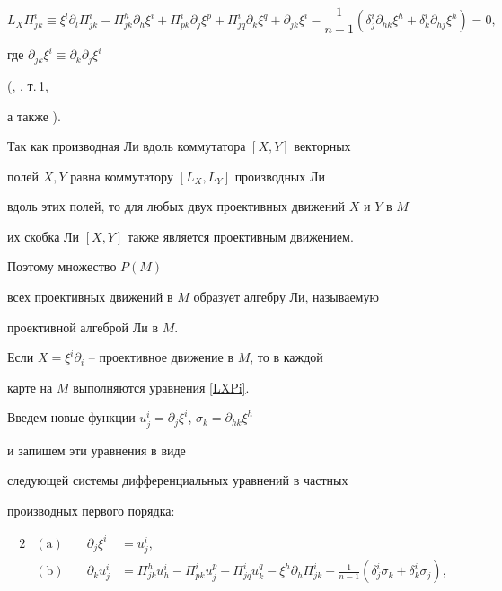 \begin{equation}\label{LXPi}


L_X\Pi ^{i}_{jk} \equiv \xi^{l}\partial_{l}\Pi^{i}_{jk}-


\Pi^{h}_{jk}\partial_{h}\xi^{i}


+\Pi^{i}_{pk}\partial_{j}\xi^{p}+


\Pi^{i}_{jq}\partial_{k}\xi^{q}+\partial_{jk}\xi^{i}-


\frac{1}{n-1}(\delta^{i}_{j}\partial_{hk}\xi^{h}


+\delta^{i}_{k}\partial_{hj}\xi^{h})=0,


\end{equation}


где $\partial_{jk}\xi^{i}\equiv \partial_{k}\partial_{j} \xi^i$


(\cite{Yano_57}, \cite{Kobayashi-Nomizu_69}, т.\,1,


а также \cite{Amin-Yanus-03}).





Так как производная Ли вдоль коммутатора $[X,Y]$ векторных


полей $X,Y$ равна коммутатору $[L_X,L_Y]$ производных Ли


вдоль этих полей, то для любых двух проективных движений $X$ и $Y$ в $M$


их скобка Ли $[X,Y]$ также является проективным движением.


Поэтому множество $P(M)$


всех проективных движений в $M$ образует алгебру Ли, называемую


проективной алгеброй Ли в $M$.





Если $X=\xi^i\partial_i$ -- проективное движение в $M$, то в каждой


карте на $M$ выполняются уравнения \eqref{LXPi}.


Введем новые функции $u_j^i=\partial_j\xi^i$, $\sigma_k=\partial_{hk}\xi^h$


и запишем эти уравнения в виде


следующей системы дифференциальных уравнений в частных


производных первого порядка:


\begin{alignat*}{2}


&(\mathrm a) & \quad \partial_j\xi^i&=u_j^i,\\


%


&(\mathrm b) &\quad 


\partial_ku_{j}^i&= \Pi^{h}_{jk}u_{h}^{i}-\Pi^{i}_{pk}u_{j}^{p}-


\Pi^{i}_{jq}u_{k}^{q}-


\xi^{h}\partial_{h}\Pi^{i}_{jk}+


\frac{1}{n-1}(\delta^{i}_{j}


\sigma_{k}+ \delta^{i}_{k}\sigma_{j}),


\end{alignat*}


